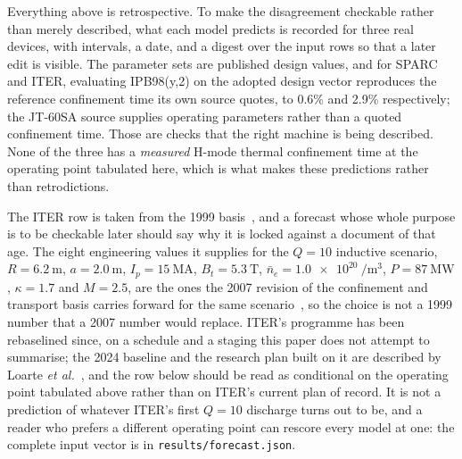 \documentclass[12pt,letterpaper]{article}
\begin{document}
Everything above is retrospective. To make the disagreement checkable rather
than merely described, what each model predicts is recorded for three real
devices, with intervals, a date, and a digest over the input rows so that a
later edit is visible. The parameter sets are published design values, and
for SPARC and ITER, evaluating IPB98(y,2) on the adopted design vector
reproduces the reference confinement time its own source quotes, to 0.6\% and
2.9\% respectively; the JT-60SA source supplies operating parameters rather than
a quoted confinement time. Those are checks that the right machine is being
described. None of the three has a \emph{measured} H-mode thermal confinement
time at the operating point tabulated here, which is what makes these
predictions rather than retrodictions.

The ITER row is taken from the 1999 basis~\cite{ipb98}, and a forecast whose
whole purpose is to be checkable later should say why it is locked against a
document of that age. The eight engineering values it supplies for the $Q=10$
inductive scenario, $R=\SI{6.2}{\metre}$, $a=\SI{2.0}{\metre}$,
$I_p=\SI{15}{\mega\ampere}$, $B_t=\SI{5.3}{\tesla}$,
$\bar{n}_e=\SI{1.0e20}{\per\cubic\metre}$, $P=\SI{87}{\mega\watt}$,
$\kappa=1.7$ and $M=2.5$, are the ones the 2007 revision of the confinement and
transport basis carries forward for the same scenario~\cite{doyle07}, so the
choice is not a 1999 number that a 2007 number would replace. ITER's programme
has been rebaselined since, on a schedule and a staging this paper does not
attempt to summarise; the 2024 baseline and the research plan built on it are
described by Loarte \emph{et al.}~\cite{loarte}, and the row below should be
read as conditional on the operating point tabulated above rather than on ITER's
current plan of record. It is not a prediction of whatever ITER's first $Q=10$ discharge
turns out to be, and a reader who prefers a different operating point can
rescore every model at one: the complete input vector is in
\texttt{results/forecast.json}.
\end{document}
